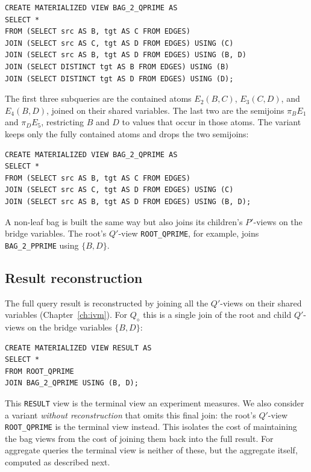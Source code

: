 \begin{lstlisting}[caption={The $Q'$-view of the child bag $b_2$ (IVM$^+$).}]
CREATE MATERIALIZED VIEW BAG_2_QPRIME AS
SELECT *
FROM (SELECT src AS B, tgt AS C FROM EDGES)
JOIN (SELECT src AS C, tgt AS D FROM EDGES) USING (C)
JOIN (SELECT src AS B, tgt AS D FROM EDGES) USING (B, D)
JOIN (SELECT DISTINCT tgt AS B FROM EDGES) USING (B)
JOIN (SELECT DISTINCT tgt AS D FROM EDGES) USING (D);
\end{lstlisting}

The first three subqueries are the contained atoms $E_2(B,C)$, $E_3(C,D)$, and $E_4(B,D)$, joined on their shared variables.
The last two are the semijoins $\pi_B E_1$ and $\pi_D E_5$, restricting $B$ and $D$ to values that occur in those atoms.
The variant keeps only the fully contained atoms and drops the two semijoins:

\begin{lstlisting}[caption={The $Q'$-view of the child bag $b_2$ (variant).}]
CREATE MATERIALIZED VIEW BAG_2_QPRIME AS
SELECT *
FROM (SELECT src AS B, tgt AS C FROM EDGES)
JOIN (SELECT src AS C, tgt AS D FROM EDGES) USING (C)
JOIN (SELECT src AS B, tgt AS D FROM EDGES) USING (B, D);
\end{lstlisting}

A non-leaf bag is built the same way but also joins its children's $P'$-views on the bridge variables.
The root's $Q'$-view \texttt{ROOT\_QPRIME}, for example, joins \texttt{BAG\_2\_PPRIME} using $\{B,D\}$.

\subsection{Result reconstruction}

The full query result is reconstructed by joining all the $Q'$-views on their shared variables (Chapter~\ref{ch:ivm}).
For $Q_\diamond$ this is a single join of the root and child $Q'$-views on the bridge variables $\{B,D\}$:

\begin{lstlisting}[caption={The \texttt{RESULT} view reconstructing the full output.}]
CREATE MATERIALIZED VIEW RESULT AS
SELECT *
FROM ROOT_QPRIME
JOIN BAG_2_QPRIME USING (B, D);
\end{lstlisting}

This \texttt{RESULT} view is the terminal view an experiment measures.
We also consider a variant \emph{without reconstruction} that omits this final join: the root's $Q'$-view \texttt{ROOT\_QPRIME} is the terminal view instead.
This isolates the cost of maintaining the bag views from the cost of joining them back into the full result.
For aggregate queries the terminal view is neither of these, but the aggregate itself, computed as described next.

